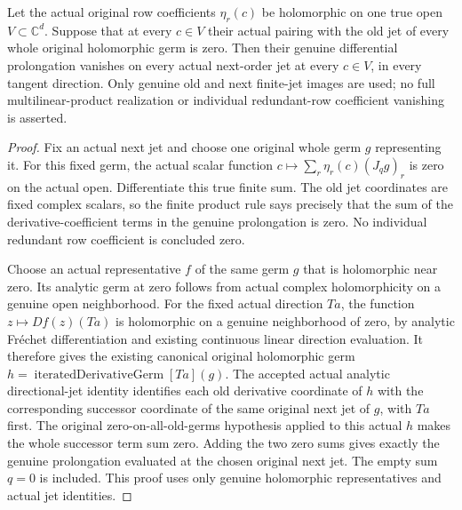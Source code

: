 \begin{theorem}
\label{hir:actual-dual-jet-prolongation-zero-old-image-zero-next-image}
\leanok
Let the actual original row coefficients $\eta_r(c)$ be holomorphic
on one true open $V\subset\mathbb C^d$. Suppose that at every
$c\in V$ their actual pairing with the old jet of every whole
original holomorphic germ is zero. Then their genuine differential
prolongation vanishes on every actual next-order jet at every
$c\in V$, in every tangent direction. Only genuine old and next
finite-jet images are used; no full multilinear-product realization
or individual redundant-row coefficient vanishing is asserted.
\end{theorem}
\begin{proof}
Fix an actual next jet and choose one original whole germ $g$
representing it. For this fixed germ, the actual scalar function
$c\mapsto\sum_r\eta_r(c)(J_qg)_r$ is zero on the actual open.
Differentiate this true finite sum. The old jet coordinates are fixed
complex scalars, so the finite product rule says precisely that the
sum of the derivative-coefficient terms in the genuine prolongation
is zero. No individual redundant row coefficient is concluded zero.

Choose an actual representative $f$ of the same germ $g$ that is
holomorphic near zero. Its analytic germ at zero follows from actual
complex holomorphicity on a genuine open neighborhood. For the fixed
actual direction $Ta$, the function $z\mapsto Df(z)(Ta)$ is
holomorphic on a genuine neighborhood of zero, by analytic Fr\'echet
differentiation and existing continuous linear direction evaluation.
It therefore gives the existing canonical original holomorphic germ
$h=\operatorname{iteratedDerivativeGerm}[Ta](g)$.
The accepted actual analytic directional-jet identity identifies each
old derivative coordinate of $h$ with the corresponding successor
coordinate of the same original next jet of $g$, with $Ta$ first.
The original zero-on-all-old-germs hypothesis applied to this actual
$h$ makes the whole successor term sum zero. Adding the two zero
sums gives exactly the genuine prolongation evaluated at the chosen
original next jet. The empty sum $q=0$ is included. This proof uses
only genuine holomorphic representatives and actual jet identities.
\end{proof}

